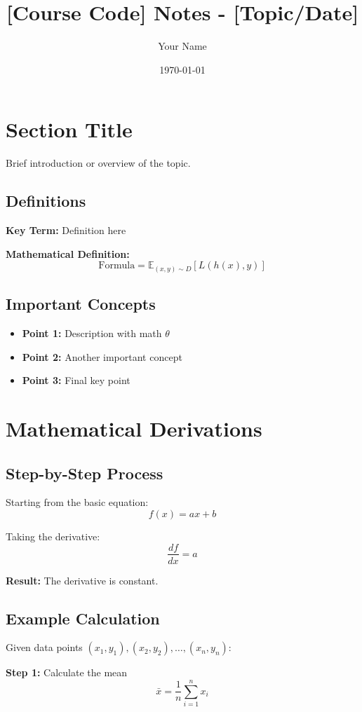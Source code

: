 \documentclass{article}
\title{[Course Code] Notes - [Topic/Date]}
\author{Your Name}
\date{\today}
\begin{document}
\maketitle

\section{Section Title}

Brief introduction or overview of the topic.

\subsection{Definitions}
\textbf{Key Term:} Definition here

\textbf{Mathematical Definition:}
\[
\text{Formula} = \mathbb{E}_{(x,y) \sim D}[L(h(x), y)]
\]

\subsection{Important Concepts}
\begin{itemize}
    \item \textbf{Point 1:} Description with math $\theta$
    \item \textbf{Point 2:} Another important concept
    \item \textbf{Point 3:} Final key point
\end{itemize}

\section{Mathematical Derivations}

\subsection{Step-by-Step Process}
Starting from the basic equation:
\[
f(x) = ax + b
\]

Taking the derivative:
\[
\frac{df}{dx} = a
\]

\textbf{Result:} The derivative is constant.

\subsection{Example Calculation}
Given data points $(x_1, y_1), (x_2, y_2), \ldots, (x_n, y_n)$:

\textbf{Step 1:} Calculate the mean
\[
\bar{x} = \frac{1}{n}\sum_{i=1}^{n} x_i
\]
\end{document}
